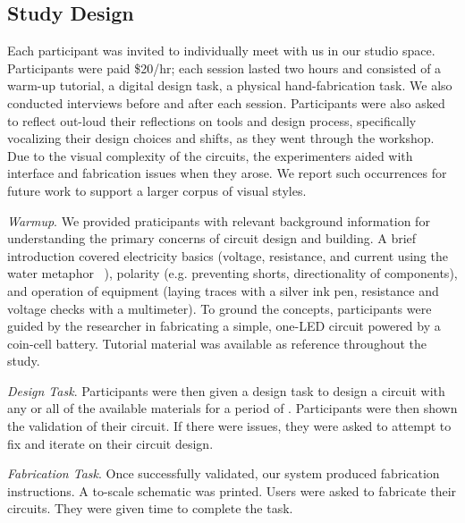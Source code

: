 \documentclass{sigchi}
\begin{document}
\subsection{Study Design}
    Each participant was invited to individually meet with us in our studio space. Participants were paid \$20/hr; each session lasted two hours and consisted of a warm-up tutorial, a digital design task, a physical hand-fabrication task. We also conducted interviews before and after each session. Participants were also asked to reflect out-loud their reflections on tools and design process, specifically vocalizing their design choices and shifts, as they went through the workshop. Due to the visual complexity of the circuits, the experimenters aided with interface and fabrication issues when they arose. We report such occurrences for future work to support a larger corpus of visual styles. 

    \textit{Warmup}. We provided praticipants with relevant background information for understanding the primary concerns of circuit design and building. A brief introduction covered electricity basics (voltage, resistance, and current using the water metaphor ~\cite{gentner_flowing_1982}), polarity (e.g. preventing shorts, directionality of components), and operation of equipment (laying traces with a silver ink pen, resistance and voltage checks with a multimeter). To ground the concepts, participants were guided by the researcher in fabricating a simple, one-LED circuit powered by a coin-cell battery. Tutorial material was available as reference throughout the study. 

    \textit{Design Task}. Participants were then given a design task to design a circuit with any or all of the available materials for a period of .  Participants were then shown the validation of their circuit. If there were issues, they were asked to attempt to fix and iterate on their circuit design. 

    \textit{Fabrication Task}. Once successfully validated, our system produced fabrication instructions. A to-scale schematic was printed. Users were asked to fabricate their circuits. They were given  time to complete the task.  
\end{document}

